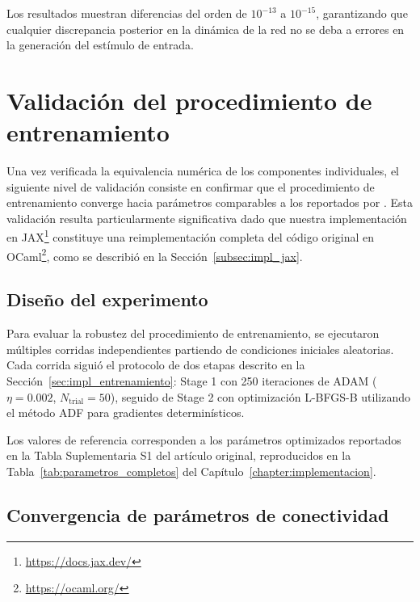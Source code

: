 Los resultados muestran diferencias del orden de $10^{-13}$ a $10^{-15}$, garantizando que cualquier discrepancia posterior en la dinámica de la red no se deba a errores en la generación del estímulo de entrada. 


\section{Validación del procedimiento de entrenamiento}
\label{sec:res_training}

Una vez verificada la equivalencia numérica de los componentes individuales, el siguiente nivel de validación consiste en confirmar que el procedimiento de entrenamiento converge hacia parámetros comparables a los reportados por \citet{echeveste2020cortical}. Esta validación resulta particularmente significativa dado que nuestra implementación en JAX\footnote{\url{https://docs.jax.dev/}} constituye una reimplementación completa del código original en OCaml\footnote{\url{https://ocaml.org/}}, como se describió en la Sección~\ref{subsec:impl_jax}.

\subsection{Diseño del experimento}
\label{subsec:res_training_design}

Para evaluar la robustez del procedimiento de entrenamiento, se ejecutaron múltiples corridas independientes partiendo de condiciones iniciales aleatorias. Cada corrida siguió el protocolo de dos etapas descrito en la Sección~\ref{sec:impl_entrenamiento}: Stage 1 con 250 iteraciones de \acrshort{ADAM} ($\eta = 0.002$, $N_{\text{trial}} = 50$), seguido de Stage 2 con optimización \acrshort{L-BFGS-B} utilizando el método \acrshort{ADF} para gradientes determinísticos.

Los valores de referencia corresponden a los parámetros optimizados reportados en la Tabla Suplementaria S1 del artículo original, reproducidos en la Tabla~\ref{tab:parametros_completos} del Capítulo~\ref{chapter:implementacion}.

\subsection{Convergencia de parámetros de conectividad}
\label{subsec:res_training_connectivity}

